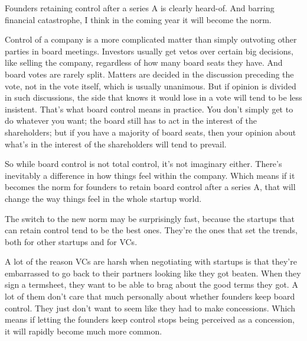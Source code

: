 Founders retaining
                    control after a series A is clearly heard-of. And barring
                    financial catastrophe, I think in the coming year it will
                    become the norm.

Control of a company is a more
                    complicated matter than simply outvoting other parties in
                    board meetings. Investors usually get vetos over certain big
                    decisions, like selling the company, regardless of how many
                    board seats they have. And board votes are rarely split.
                    Matters are decided in the discussion preceding the vote,
                    not in the vote itself, which is usually unanimous. But if
                    opinion is divided in such discussions, the side that knows
                    it would lose in a vote will tend to be less insistent.
                    That's what board control means in practice. You don't
                    simply get to do whatever you want; the board still has to
                    act in the interest of the shareholders; but if you have a
                    majority of board seats, then your opinion about what's in
                    the interest of the shareholders will tend to prevail.

So
                    while board control is not total control, it's not imaginary
                    either. There's inevitably a difference in how things feel
                    within the company. Which means if it becomes the norm for
                    founders to retain board control after a series A, that will
                    change the way things feel in the whole startup world.

The
                    switch to the new norm may be surprisingly fast, because the
                    startups that can retain control tend to be the best ones.
                    They're the ones that set the trends, both for other
                    startups and for VCs.

A lot of the reason VCs are
                    harsh when negotiating with startups is that they're
                    embarrassed to go back to their partners looking like they
                    got beaten. When they sign a termsheet, they want to be able
                    to brag about the good terms they got. A lot of them don't
                    care that much personally about whether founders keep board
                    control. They just don't want to seem like they had to make
                    concessions. Which means if letting the founders keep
                    control stops being perceived as a concession, it will
                    rapidly become much more common.


